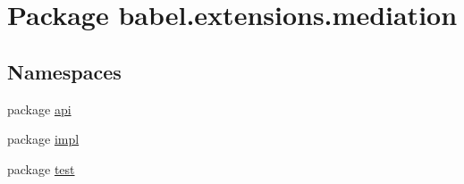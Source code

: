 \hypertarget{namespacebabel_1_1extensions_1_1mediation}{\section{Package babel.\-extensions.\-mediation}
\label{namespacebabel_1_1extensions_1_1mediation}
}
\subsection*{Namespaces}
\begin{DoxyCompactItemize}
\item 
package \hyperlink{namespacebabel_1_1extensions_1_1mediation_1_1api}{api}
\item 
package \hyperlink{namespacebabel_1_1extensions_1_1mediation_1_1impl}{impl}
\item 
package \hyperlink{namespacebabel_1_1extensions_1_1mediation_1_1test}{test}
\end{DoxyCompactItemize}
